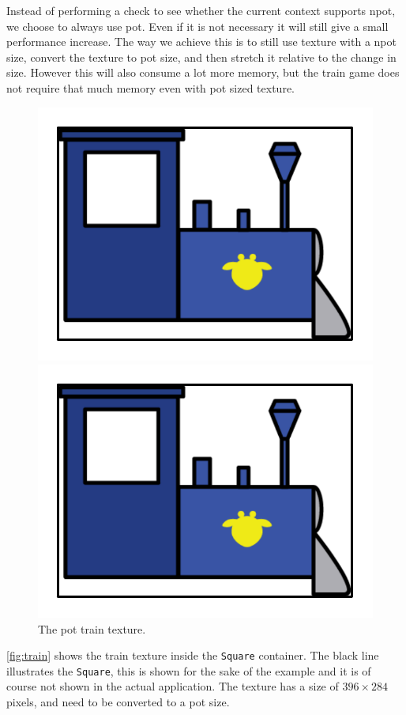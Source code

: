 Instead of performing a check to see whether the current context supports \ac{npot}, we choose to always use \ac{pot}. Even if it is not necessary it will still give a small performance increase. The way we achieve this is to still use texture with a \ac{npot} size, convert the texture to \ac{pot} size, and then stretch it relative to the change in size. However this will also consume a lot more memory, but the train game does not require that much memory even with \ac{pot} sized texture.
\begin{figure}[H]
\begin{minipage}[b]{0.5\columnwidth}
\centering
\includegraphics[page=1,width=0.8\columnwidth]{img/powerOfTwo.pdf}
\caption{The \ac{npot} train texture inside the \lstinline|Square| container.\label{fig:train}}
\end{minipage}
\hspace{0.5cm}
\begin{minipage}[b]{0.5\columnwidth}
\centering
\includegraphics[page=2,width=0.8\columnwidth]{img/powerOfTwo.pdf}
\caption{The \ac{pot} train texture.\label{fig:trainpot}}
\end{minipage}
\end{figure}
\autoref{fig:train} shows the train texture inside the \lstinline|Square| container. The black line illustrates the \lstinline|Square|, this is shown for the sake of the example and it is of course not shown in the actual application. The texture has a size of $396 \times 284$ pixels, and need to be converted to a \ac{pot} size.

